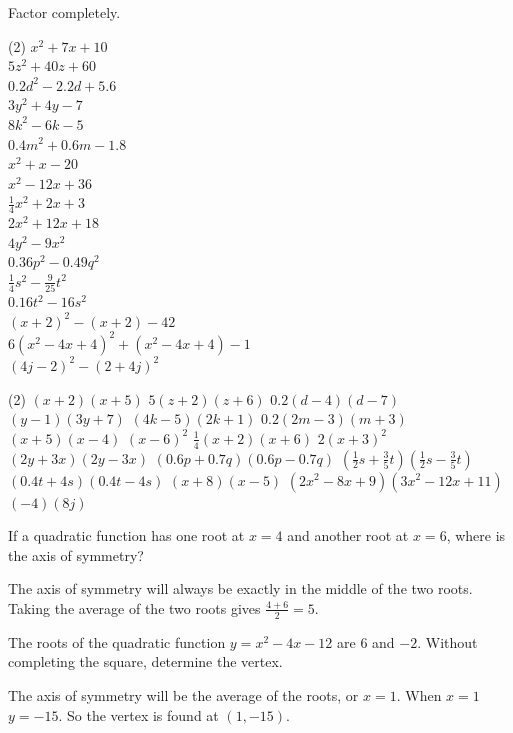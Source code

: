 \documentclass[12pt,fleqn]{book}
\newcommand{\prb}[1]{\begin{Exercise}#1\end{Exercise}}
\newcommand{\sol}[1]{\begin{Answer}#1\end{Answer}}
\begin{document}
\prb{Factor completely.
	\begin{tasks}(2)
		\task $x^2+7 x+10$
		\\[5em]
		\task $5 z^2+40 z+60$
		\\[5em]
		\task $0.2 d^2-2.2 d+5.6$
		\\[5em]
		\task $3 y^2+4 y-7$
		\\[5em]
		\task $8 k^2-6 k-5$
		\\[5em]
		\task $0.4 m^2+0.6 m-1.8$
		\\[5em]
		\task $x^2+x-20$
		\\[5em]
		\task $x^2-12 x+36$
		\\[5em]
		\task $\frac{1}{4} x^2+2 x+3$
		\\[5em]
		\task $2 x^2+12 x+18$
		\\[5em]
		\task $4 y^2-9 x^2$
		\\[5em]
		\task $0.36 p^2-0.49 q^2$
		\\[5em]
		\task $\frac{1}{4} s^2-\frac{9}{25} t^2$
		\\[5em]
		\task $0.16 t^2-16 s^2$
		\\[5em]
		\task $(x+2)^2-(x+2)-42$
		\\[5em]
		\task $6\left(x^2-4 x+4\right)^2+\left(x^2-4 x+4\right)-1$
		\\[5em]
		\task $(4 j-2)^2-(2+4 j)^2$
		\\[5em]
	\end{tasks}
}
\sol{
	\begin{tasks}(2)
		\task $(x+2)(x+5)$
		\task $5(z+2)(z+6)$
		\task $0.2(d-4)(d-7)$
		\task $(y-1)(3 y+7)$
		\task $(4 k-5)(2 k+1)$
		\task $0.2(2 m-3)(m+3)$
		\task $(x+5)(x-4)$
		\task $(x-6)^2$
		\task $\frac{1}{4}(x+2)(x+6)$
		\task $2(x+3)^2$
		\task $(2 y+3 x)(2 y-3 x)$
		\task $(0.6 p+0.7 q)(0.6 p-0.7 q)$
		\task $\left(\frac{1}{2} s+\frac{3}{5} t\right)\left(\frac{1}{2} s-\frac{3}{5} t\right)$
		\task $(0.4 t+4 s)(0.4 t-4 s)$
		\task $(x+8)(x-5)$
		\task $\left(2 x^2-8 x+9\right)\left(3 x^2-12 x+11\right)$
		\task $(-4)(8 j)$
	\end{tasks}
}

\prb{If a quadratic function has one root at $x=4$ and another root at $x=6$, where is the axis of symmetry?\\[5em]}
\sol{The axis of symmetry will always be exactly in the middle of the two roots.  Taking the average of the two roots gives $\frac{4+6}{2}=5$.}

\prb{The roots of the quadratic function $y=x^2-4x-12$ are $6$ and $-2$.  Without completing the square, determine the vertex.\\[5em]}
\sol{The axis of symmetry will be the average of the roots, or $x=1$.  When $x=1$ $y=-15$.  So the vertex is found at $(1,-15)$.}
\end{document}
